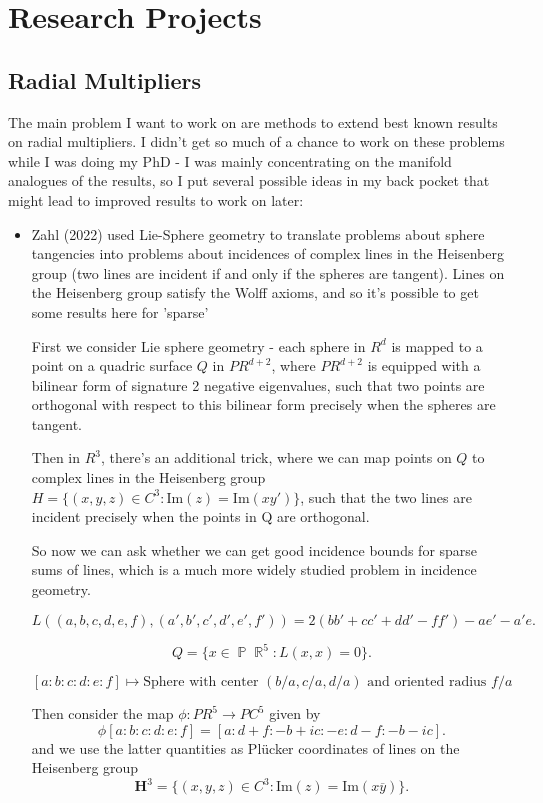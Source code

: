 \documentclass[11pt]{article}
\DeclareMathOperator{\RR}{\mathbb{R}}
\DeclareMathOperator{\PP}{\mathbb{P}}
\begin{document}
\section{Research Projects}

\subsection{Radial Multipliers}

The main problem I want to work on are methods to extend best known results on radial multipliers. I didn't get so much of a chance to work on these problems while I was doing my PhD - I was mainly concentrating on the manifold analogues of the results, so I put several possible ideas in my back pocket that might lead to improved results to work on later:

\begin{itemize}
    \item Zahl (2022) used Lie-Sphere geometry to translate problems about sphere tangencies into problems about incidences of complex lines in the Heisenberg group (two lines are incident if and only if the spheres are tangent). Lines on the Heisenberg group satisfy the Wolff axioms, and so it's possible to get some results here for 'sparse'

    First we consider Lie sphere geometry - each sphere in $R^d$ is mapped to a point on a quadric surface $Q$ in $PR^{d+2}$, where $PR^{d+2}$ is equipped with a bilinear form of signature 2 negative eigenvalues, such that two points are orthogonal with respect to this bilinear form precisely when the spheres are tangent.

    Then in $R^3$, there's an additional trick, where we can map points on $Q$ to complex lines in the Heisenberg group $H = \{ (x,y,z) \in C^3: \text{Im}(z) = \text{Im}(xy') \}$, such that the two lines are incident precisely when the points in Q are orthogonal. 

    So now we can ask whether we can get good incidence bounds for sparse sums of lines, which is a much more widely studied problem in incidence geometry.

    \[ L((a,b,c,d,e,f),(a',b',c',d',e',f')) = 2(bb' + cc' + dd' - ff') - ae' - a'e. \]

    \[ Q = \{ x \in \PP \RR^5: L(x,x) = 0 \}. \]

    \[ [a:b:c:d:e:f] \mapsto \text{Sphere with center $(b/a,c/a,d/a)$ and oriented radius $f/a$} \]

    Then consider the map $\phi: PR^5 \to PC^5$ given by
    \[ \phi[a:b:c:d:e:f] = [a: d+ f: -b+ic: -e: d - f: -b - ic]. \]
    and we use the latter quantities as Pl\"{u}cker coordinates of lines on the Heisenberg group
    \[ \mathbf{H}^3 = \{ (x,y,z) \in C^3: \text{Im}(z) = \text{Im}(x\overline{y}) \}. \]


\end{itemize}
\end{document}
